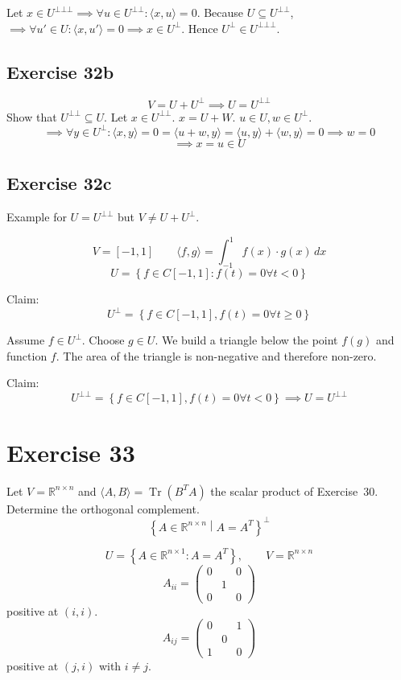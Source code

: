 \documentclass[a4paper]{article}
\theoremstyle{definition}
\newcommand\set[1]{\left\{#1\right\}}
\newcommand\ip[2]{\langle{#1},{#2}\rangle}
\begin{document}
Let $x \in U^{\bot\bot\bot} \implies \forall u \in U^{\bot\bot}: \ip xu = 0$.
Because $U \subseteq U^{\bot\bot}$, $\implies \forall u' \in U: \ip{x}{u'} = 0 \implies x \in U^{\bot}$.
Hence $U^{\bot} \in U^{\bot\bot\bot}$.

\subsection{Exercise 32b}

\[ V = U + U^{\bot} \implies U = U^{\bot\bot} \]
Show that $U^{\bot\bot} \subseteq U$.
Let $x \in U^{\bot\bot}$. $x = U + W$. $u \in U, w \in U^{\bot}$.
\[ \implies \forall y \in U^{\bot}: \ip xy = 0 = \ip{u+w}{y} = \ip uy + \ip wy = 0 \implies w = 0 \]
\[ \implies x = u \in U \]

\subsection{Exercise 32c}
Example for $U = U^{\bot\bot}$ but $V \neq U + U^{\bot}$.

\[ V = [-1,1] \qquad \ip fg = \int_{-1}^1 f(x) \cdot g(x) \, dx \]
\[ U = \set{f \in C[-1,1]: f(t) = 0 \forall t < 0} \]

Claim:
\[ U^{\bot} = \set{f \in C[-1,1], f(t) = 0 \forall t \geq 0} \]

Assume $f \in U^{\bot}$. Choose $g \in U$. We build a triangle below the point $f(g)$ and function $f$. The area of the triangle is non-negative and therefore non-zero.

Claim:
\[ U^{\bot\bot} = \set{f \in C[-1,1], f(t) = 0 \forall t < 0} \implies U = U^{\bot\bot} \]

\section*{Exercise 33}
\begin{ex}
  Let $V = \mathbb R^{n\times n}$ and $\langle A,B\rangle = \operatorname{Tr}(B^TA)$ the scalar product of Exercise~30.
  Determine the orthogonal complement.
  \[ \set{A \in \mathbb R^{n\times n} \middle| A = A^T}^\bot \]
\end{ex}

\[ U = \set{A \in \mathbb R^{n\times 1}: A = A^T}, \qquad V = \mathbb R^{n\times n} \]
\[
  A_{ii} = \begin{pmatrix}
    0 &   & 0 \\
      & 1 & \\
    0 &   & 0
  \end{pmatrix}
\]
positive at $(i,i)$.
\[
  A_{ij} = \begin{pmatrix}
    0 &   & 1 \\
      & 0 &  \\
    1 &   & 0
  \end{pmatrix}
\]
positive at $(j,i)$ with $i \neq j$.
\end{document}
